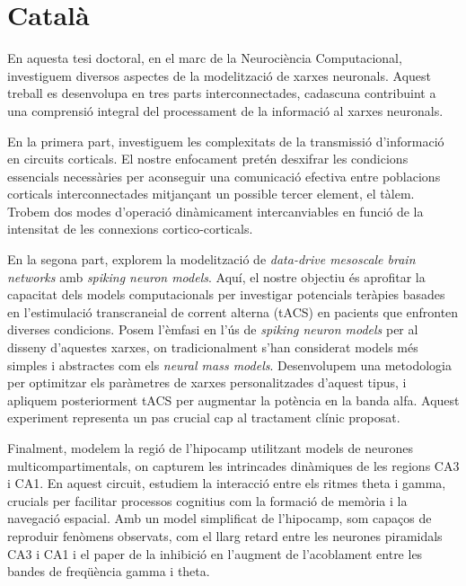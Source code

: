 \documentclass[../main.tex]{subfiles}
\begin{document}
\section*{Català}
\begin{otherlanguage}{catalan}
En aquesta tesi doctoral, en el marc de la Neurociència Computacional, investiguem diversos aspectes de la modelització de xarxes neuronals.
Aquest treball es desenvolupa en tres parts interconnectades, cadascuna contribuint a una comprensió integral del processament de la informació al xarxes neuronals.

En la primera part, investiguem les complexitats de la transmissió d'informació en circuits corticals. El nostre enfocament pretén desxifrar les condicions essencials necessàries per aconseguir una comunicació efectiva entre poblacions corticals interconnectades mitjançant un possible tercer element, el tàlem.
Trobem dos modes d'operació dinàmicament intercanviables en funció de la intensitat de les connexions cortico-corticals.

En la segona part, explorem la modelització de \textit{data-drive mesoscale brain networks} amb \textit{spiking neuron models}.
Aquí, el nostre objectiu és aprofitar la capacitat dels models computacionals per investigar potencials teràpies basades en l'estimulació transcraneial de corrent alterna (tACS) en pacients que enfronten diverses condicions.
Posem l'èmfasi en l'ús de \textit{spiking neuron models} per al disseny d'aquestes xarxes, on tradicionalment s'han considerat models més simples i abstractes com els \textit{neural mass models}.
Desenvolupem una metodologia per optimitzar els paràmetres de xarxes personalitzades d'aquest tipus, i apliquem posteriorment tACS per augmentar la potència en la banda alfa.
Aquest experiment representa un pas crucial cap al tractament clínic proposat. 

Finalment, modelem la regió de l'hipocamp utilitzant models de neurones multicompartimentals, on capturem les intrincades dinàmiques de les regions CA3 i CA1.
En aquest circuit, estudiem la interacció entre els ritmes theta i gamma, crucials per facilitar processos cognitius com la formació de memòria i la navegació espacial.
Amb un model simplificat de l'hipocamp, som capaços de reproduir fenòmens observats, com el llarg retard entre les neurones piramidals CA3 i CA1 i el paper de la inhibició en l'augment de l'acoblament entre les bandes de freqüència gamma i theta.


\end{otherlanguage}
\end{document}
